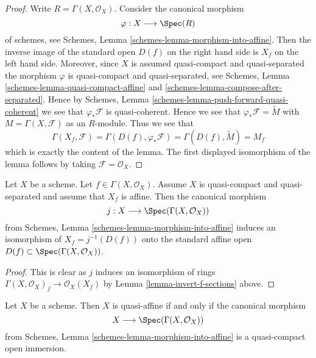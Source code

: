 \begin{proof}
Write $R = \Gamma(X, \mathcal{O}_X)$.
Consider the canonical morphism
$$
\varphi : X \longrightarrow \Spec(R)
$$
of schemes, see
Schemes, Lemma
\ref{schemes-lemma-morphism-into-affine}.
Then the inverse image of the standard open $D(f)$ on the
right hand side is $X_f$ on the left hand side.
Moreover, since $X$ is assumed quasi-compact and quasi-separated
the morphism $\varphi$ is quasi-compact and quasi-separated,
see Schemes, Lemma \ref{schemes-lemma-quasi-compact-affine} and
\ref{schemes-lemma-compose-after-separated}. Hence by
Schemes, Lemma \ref{schemes-lemma-push-forward-quasi-coherent}
we see that $\varphi_*\mathcal{F}$ is quasi-coherent.
Hence we see that $\varphi_*\mathcal{F} = \widetilde M$
with $M = \Gamma(X, \mathcal{F})$ as an $R$-module.
Thus we see that
$$
\Gamma(X_f, \mathcal{F}) =
\Gamma(D(f), \varphi_*\mathcal{F}) =
\Gamma(D(f), \widetilde M) = M_f
$$
which is exactly the content of the lemma. The first displayed isomorphism
of the lemma follows by taking $\mathcal{F} = \mathcal{O}_X$.
\end{proof}

\begin{lemma}
\label{lemma-invert-f-affine}
Let $X$ be a scheme. Let $f \in \Gamma(X, \mathcal{O}_X)$.
Assume $X$ is quasi-compact and quasi-separated and assume that
$X_f$ is affine. Then the canonical morphism
$$
j : X \longrightarrow \Spec(\Gamma(X, \mathcal{O}_X))
$$
from Schemes, Lemma \ref{schemes-lemma-morphism-into-affine}
induces an isomorphism of $X_f = j^{-1}(D(f))$ onto the standard affine
open $D(f) \subset \Spec(\Gamma(X, \mathcal{O}_X))$.
\end{lemma}

\begin{proof}
This is clear as $j$ induces an isomorphism of rings
$\Gamma(X, \mathcal{O}_X)_f \to \mathcal{O}_X(X_f)$ by
Lemma \ref{lemma-invert-f-sections} above.
\end{proof}

\begin{lemma}
\label{lemma-quasi-affine}
Let $X$ be a scheme. Then $X$ is quasi-affine if and only if
the canonical morphism
$$
X \longrightarrow \Spec(\Gamma(X, \mathcal{O}_X))
$$
from Schemes, Lemma \ref{schemes-lemma-morphism-into-affine} is
a quasi-compact open immersion.
\end{lemma}

